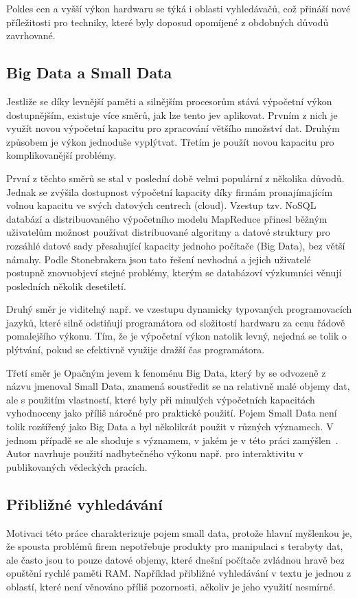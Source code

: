 \documentclass[11pt,letterpaper,oneside,openright]{book}
\begin{document}
Pokles cen a vyšší výkon hardwaru se týká i oblasti vyhledávačů, což přináší
nové příležitosti pro techniky, které byly doposud opomíjené z obdobných důvodů
zavrhované.

\subsection{Big Data a Small Data}
Jestliže se díky levnější paměti a silnějším procesorům stává výpočetní výkon
dostupnějším, existuje více směrů, jak lze tento jev aplikovat. Prvním z nich
je využít novou výpočetní kapacitu pro zpracování většího množství dat. Druhým
způsobem je výkon jednoduše vyplýtvat. Třetím je použít novou kapacitu pro
komplikovanější problémy.

První z těchto směrů se stal v poslední době velmi populární z několika důvodů.
Jednak se zvýšila dostupnost výpočetní kapacity díky firmám pronajímajícím
volnou kapacitu ve svých datových centrech (cloud). Vzestup tzv. NoSQL databází
a distribuovaného výpočetního modelu MapReduce přinesl běžným uživatelům
možnost používat distribuované algoritmy a datové struktury pro rozsáhlé datové
sady přesahující kapacity jednoho počítače (Big Data), bez větší námahy.  Podle
Stonebrakera jsou tato řešení nevhodná a jejich uživatelé postupně znovuobjeví
stejné problémy, kterým se databázoví výzkumníci věnují posledních několik
desetiletí.

Druhý směr je viditelný např. ve vzestupu dynamicky typovaných programovacích
jazyků, které silně odstiňují programátora od složitostí hardwaru za cenu
řádově pomalejšího výkonu. Tím, že je výpočetní výkon natolik levný, nejedná se
tolik o plýtvání, pokud se efektivně využije dražší čas programátora. 

Třetí směr je Opačným jevem k fenoménu Big Data, který by se odvozeně z názvu
jmenoval Small Data, znamená soustředit se na relativně malé objemy dat, ale s
použitím vlastností, které byly při minulých výpočetních kapacitách vyhodnoceny
jako příliš náročné pro praktické použití. Pojem Small Data není tolik
rozšířený jako Big Data a byl několikrát použit v různých významech. V jednom
případě se ale shoduje s významem, v jakém je v této práci
zamýšlen~\cite{small_data}. Autor navrhuje použití nadbytečného výkonu např.
pro interaktivitu v publikovaných vědeckých pracích. 

\subsection{Přibližné vyhledávání}
Motivaci této práce charakterizuje pojem small data, protože hlavní myšlenkou
je, že spousta problémů firem nepotřebuje produkty pro manipulaci s terabyty
dat, ale často jsou to pouze datové objemy, které dnešní počítače zvládnou
hravě bez opuštění rychlé paměti RAM. Například přibližné vyhledávání v textu
je jednou z oblastí, které není věnováno příliš pozornosti, ačkoliv je jeho
využití nesmírné.
\end{document}
